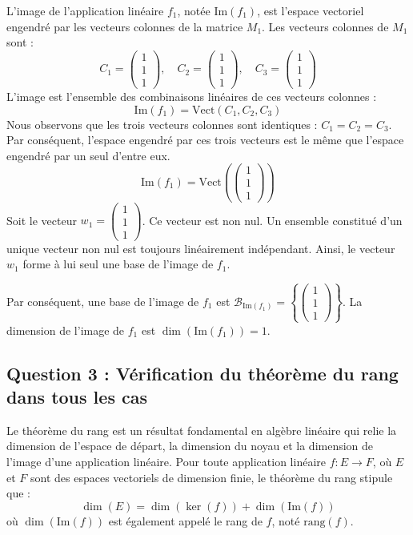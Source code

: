 \documentclass{report}
\begin{document}
L'image de l'application linéaire $f_1$, notée $\text{Im}(f_1)$, est l'espace vectoriel engendré par les vecteurs colonnes de la matrice $M_1$.
Les vecteurs colonnes de $M_1$ sont :
$$ C_1 = \begin{pmatrix} 1 \\ 1 \\ 1 \end{pmatrix}, \quad C_2 = \begin{pmatrix} 1 \\ 1 \\ 1 \end{pmatrix}, \quad C_3 = \begin{pmatrix} 1 \\ 1 \\ 1 \end{pmatrix} $$
L'image est l'ensemble des combinaisons linéaires de ces vecteurs colonnes :
$$ \text{Im}(f_1) = \text{Vect}(C_1, C_2, C_3) $$
Nous observons que les trois vecteurs colonnes sont identiques : $C_1 = C_2 = C_3$.
Par conséquent, l'espace engendré par ces trois vecteurs est le même que l'espace engendré par un seul d'entre eux.
$$ \text{Im}(f_1) = \text{Vect}\left(\begin{pmatrix} 1 \\ 1 \\ 1 \end{pmatrix}\right) $$
Soit le vecteur $w_1 = \begin{pmatrix} 1 \\ 1 \\ 1 \end{pmatrix}$. Ce vecteur est non nul. Un ensemble constitué d'un unique vecteur non nul est toujours linéairement indépendant.
Ainsi, le vecteur $w_1$ forme à lui seul une base de l'image de $f_1$.

Par conséquent, une base de l'image de $f_1$ est $\mathcal{B}_{\text{Im}(f_1)} = \left\{ \begin{pmatrix} 1 \\ 1 \\ 1 \end{pmatrix} \right\}$.
La dimension de l'image de $f_1$ est $\dim(\text{Im}(f_1)) = 1$.

\subsection*{Question 3 : Vérification du théorème du rang dans tous les cas}

Le théorème du rang est un résultat fondamental en algèbre linéaire qui relie la dimension de l'espace de départ, la dimension du noyau et la dimension de l'image d'une application linéaire.
Pour toute application linéaire $f: E \to F$, où $E$ et $F$ sont des espaces vectoriels de dimension finie, le théorème du rang stipule que :
$$ \dim(E) = \dim(\ker(f)) + \dim(\text{Im}(f)) $$
où $\dim(\text{Im}(f))$ est également appelé le rang de $f$, noté $\text{rang}(f)$.
\end{document}
